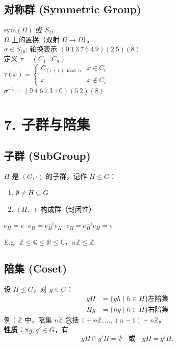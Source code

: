 \documentclass[12pt, a4paper]{article}
\begin{document}
\subsection*{对称群 (Symmetric Group)}
\(\text{sym}(\Omega)\) 或 \(S_\Omega\) \\
$\Omega$ 上的置换（双射 $\Omega \to \Omega$）。\\
$\sigma \in S_{10}$: 轮换表示 \((0\ 1\ 3\ 7\ 6\ 4\ 9)(2\ 5)(8)\) \\
定义 $\tau = (C_1 \dots C_n)$ \\
$\tau(x) = \begin{cases} C_{(i+1) \bmod n} & x \in C_i \\ x & x \notin C_i \end{cases}$ \\
$\sigma^{-1} = (9 \ 4 \ 6 \ 7 \ 3 \ 1 \ 0)(5 \ 2)(8)$

\section*{7. 子群与陪集}

\subsection*{子群 (SubGroup)}
$H$ 是 $(G, \cdot)$ 的子群，记作 $H \leq G$：
\begin{enumerate}
    \item $\emptyset \neq H \subseteq G$
    \item $(H, \cdot)$ 构成群（封闭性）
\end{enumerate}
$e_H = e \cdot e_H = e_H^{-1} e_H \cdot e_H = e_H^{-1} e_H = e$

E.g.\  \(\mathbb{Z} \leq \mathbb{Q} \leq \mathbb{R} \leq \mathbb{C}\)，$n\mathbb{Z} \leq \mathbb{Z}$

\subsection*{陪集 (Coset)}
设 $H \leq G$，对 $g \in G$：
\begin{align*}
    gH &= \{gh \mid h \in H\} \text{左陪集}\\
    Hg &= \{hg \mid h \in H\} \text{右陪集}
\end{align*}
例：$\mathbb{Z}$ 中，陪集 $n\mathbb{Z}$ 包括 $1 + n\mathbb{Z}, \dots, (n-1) + n\mathbb{Z}$。\\
\textbf{性质}：\(\forall g, g' \in G\)，有
\[
gH \cap g'H = \emptyset
\quad\text{或}\quad
gH = g'H.
\]
\end{document}
